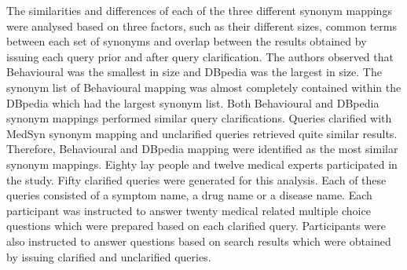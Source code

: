 \documentclass[]{article}
\begin{document}
\begin{enumerate}
The similarities and differences of each of the three different synonym mappings were analysed based on three factors, such as their different sizes, common terms between each set of synonyms and overlap between the results obtained by issuing each query prior and after query clarification.  The authors observed that Behavioural was the smallest in size and DBpedia was the largest in size. The synonym list of Behavioural mapping was almost completely contained within the DBpedia which had the largest synonym list.  Both Behavioural and DBpedia synonym mappings performed similar query clarifications. Queries clarified with MedSyn synonym mapping and unclarified queries retrieved quite similar results. Therefore, Behavioural and DBpedia mapping were identified as the most similar synonym mappings. Eighty lay people and  twelve medical experts participated in the study.  Fifty clarified queries were generated for this analysis. Each of these queries consisted of a symptom name, a drug name or a disease name. Each participant was instructed to answer twenty medical related multiple choice questions which were prepared based on each clarified query. Participants were also instructed to answer questions based on search results which were obtained by issuing clarified  and unclarified queries.


\end{enumerate}
\end{document}
